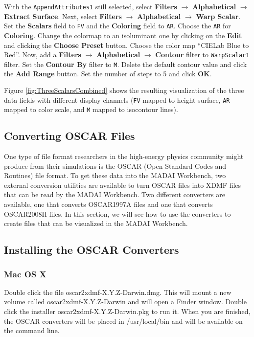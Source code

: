 \documentclass[12pt]{article}
\newcommand{\filter}[1]{\textbf{#1}}
\newcommand{\filterinstance}[1]{\texttt{#1}}
\newcommand{\menu}[1]{\textbf{#1}}
\newcommand{\setting}[1]{\textbf{#1}}
\newcommand{\field}[1]{\texttt{#1}}
\begin{document}
With the \filterinstance{AppendAttributes1} still selected, select \filter{Filters} $\rightarrow$ \filter{Alphabetical} $\rightarrow$ \filter{Extract Surface}. Next, select \filter{Filters} $\rightarrow$ \filter{Alphabetical} $\rightarrow$ \filter{Warp Scalar}. Set the \setting{Scalars} field to \field{FV} and the \setting{Coloring} field to \field{AR}. Choose the \field{AR} for \setting{Coloring}. Change the colormap to an isoluminant one by clicking on the \setting{Edit} and clicking the \setting{Choose Preset} button. Choose the color map ``CIELab Blue to Red''.  Now, add a \menu{Filters} $\rightarrow$ \menu{Alphabetical} $\rightarrow$ \menu{Contour} filter to \filterinstance{WarpScalar1} filter. Set the \setting{Contour By} filter to \field{M}. Delete the default contour value and click the \setting{Add Range} button. Set the number of steps to 5 and click \setting{OK}.

Figure \ref{fig:ThreeScalarsCombined} shows the resulting visualization of the three data fields with different display channels (\field{FV} mapped to height surface, \field{AR} mapped to color scale, and \field{M} mapped to isocontour lines).

\subsection{Converting OSCAR Files}

One type of file format researchers in the high-energy physics community might produce from their simulations is the OSCAR (Open Standard Codes and Routines) file format. To get these data into the MADAI Workbench, two external conversion utilities are available to turn OSCAR files into XDMF files that can be read by the MADAI Workbench. Two different converters are available, one that converts OSCAR1997A files and one that converts OSCAR2008H files. In this section, we will see how to use the converters to create files that can be visualized in the MADAI Workbench.

\subsection{Installing the OSCAR Converters}

\subsubsection{Mac OS X}

Double click the file oscar2xdmf-X.Y.Z-Darwin.dmg.  This will mount a new volume called oscar2xdmf-X.Y.Z-Darwin and will open a Finder window. Double click the installer oscar2xdmf-X.Y.Z-Darwin.pkg to run it. When you are finished, the OSCAR converters will be placed in /usr/local/bin and will be available on the command line.
\end{document}
